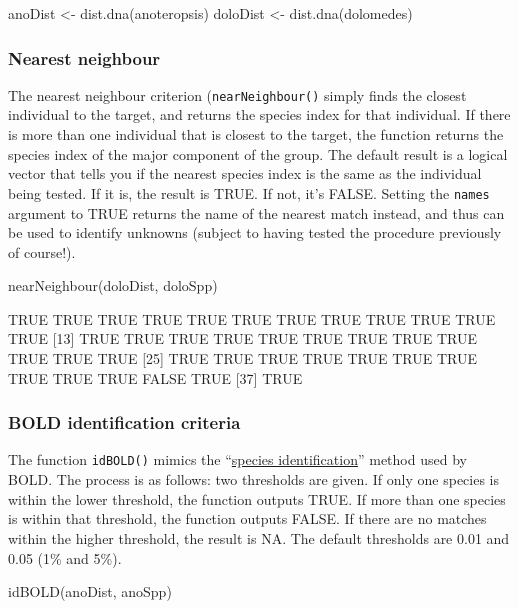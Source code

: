 \documentclass{article}
\newcommand{\fun}[1]{\texttt{#1}}
\begin{document}
\begin{console}
anoDist <- dist.dna(anoteropsis)
doloDist <- dist.dna(dolomedes)
\end{console}

\subsubsection{Nearest neighbour}
The nearest neighbour criterion (\fun{nearNeighbour()} simply finds the closest individual to the target, and returns the species index for that individual. If there is more than one individual that is closest to the target, the function returns the species index of the major component of the group. The default result is a logical vector that tells you if the nearest species index is the same as the individual being tested. If it is, the result is TRUE. If not, it's FALSE. Setting the \fun{names} argument to TRUE returns the name of the nearest match instead, and thus can be used to identify unknowns (subject to having tested the procedure previously of course!). 

\begin{console}
nearNeighbour(doloDist, doloSpp)
\end{console}

\begin{Routput}
 [1]  TRUE  TRUE  TRUE  TRUE  TRUE  TRUE  TRUE  TRUE  TRUE  TRUE  TRUE  TRUE
[13]  TRUE  TRUE  TRUE  TRUE  TRUE  TRUE  TRUE  TRUE  TRUE  TRUE  TRUE  TRUE
[25]  TRUE  TRUE  TRUE  TRUE  TRUE  TRUE  TRUE  TRUE  TRUE  TRUE FALSE  TRUE
[37]  TRUE
\end{Routput}

\subsubsection{BOLD identification criteria}
The function \fun{idBOLD()} mimics the ``\href{http://www.barcodinglife.com/views/idrequest.php}{species identification}'' method used by BOLD. The process is as follows: two thresholds are given. If only one species is within the lower threshold, the function outputs TRUE. If more than one species is within that threshold, the function outputs FALSE. If there are no matches within the higher threshold, the result is NA. The default thresholds are 0.01 and 0.05 (1\% and 5\%). 

\begin{console}
idBOLD(anoDist, anoSpp)
\end{console}
\end{document}
